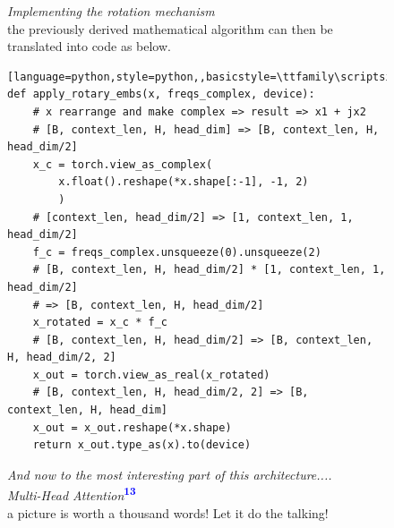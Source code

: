 \documentclass[12pt]{article}
\newcommand{\customtext}[3]{%
    \vspace{#2} %
    \fontsize{13}{8}\textcolor{#1}{\textit{#3}}%
}
\newcommand{\sidecite}[1]{\textsuperscript{\textcolor{blue}{\textbf{\scriptsize#1}}}}
\begin{document}
\begin{figure}[!htb]
    \begin{minipage}[t]{0.65\textwidth}
    \raggedright
    \customtext{xtitle}{-1em}{Implementing the rotation mechanism}\\
    the previously derived mathematical algorithm can then be translated into code as below.
\begin{lstlisting}[language=python,style=python,,basicstyle=\ttfamily\scriptsize]
def apply_rotary_embs(x, freqs_complex, device):
    # x rearrange and make complex => result => x1 + jx2
    # [B, context_len, H, head_dim] => [B, context_len, H, head_dim/2]
    x_c = torch.view_as_complex(
        x.float().reshape(*x.shape[:-1], -1, 2)
        ) 
    # [context_len, head_dim/2] => [1, context_len, 1, head_dim/2]
    f_c = freqs_complex.unsqueeze(0).unsqueeze(2)
    # [B, context_len, H, head_dim/2] * [1, context_len, 1, head_dim/2]
    # => [B, context_len, H, head_dim/2]
    x_rotated = x_c * f_c
    # [B, context_len, H, head_dim/2] => [B, context_len, H, head_dim/2, 2]
    x_out = torch.view_as_real(x_rotated)
    # [B, context_len, H, head_dim/2, 2] => [B, context_len, H, head_dim]
    x_out = x_out.reshape(*x.shape)
    return x_out.type_as(x).to(device)
\end{lstlisting}
\textit{\small And now to the most interesting part of this architecture....}\\
\vspace{0.5em}
\textcolor{xtitle}{{\it Multi-Head Attention}}\sidecite{13}\\
a picture is worth a thousand words! Let it do the talking!
\end{minipage}
\end{figure}
\end{document}
